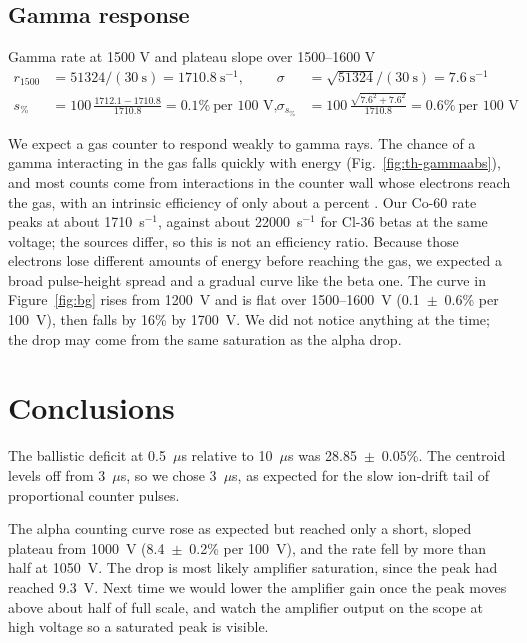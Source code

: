 \documentclass[12pt]{article}
\begin{document}
\subsection{Gamma response}

\begin{samplecalc}{Gamma rate at 1500 V and plateau slope over 1500--1600 V}
\begin{align*}
r_{1500} &= 51324/(30\ \text{s}) = 1710.8\ \text{s}^{-1}, & \sigma &= \sqrt{51324}/(30\ \text{s}) = 7.6\ \text{s}^{-1}\\
s_{\%} &= 100\,\frac{1712.1 - 1710.8}{1710.8} = 0.1\%\ \text{per 100 V}, & \sigma_{s_\%} &= 100\,\frac{\sqrt{7.6^2 + 7.6^2}}{1710.8} = 0.6\%\ \text{per 100 V}
\end{align*}
\end{samplecalc}

We expect a gas counter to respond weakly to gamma rays. The chance of a gamma interacting in the gas falls quickly with energy (Fig.~\ref{fig:th-gammaabs}), and most counts come from interactions in the counter wall whose electrons reach the gas, with an intrinsic efficiency of only about a percent \cite{knoll}. Our Co-60 rate peaks at about 1710~s$^{-1}$, against about 22000~s$^{-1}$ for Cl-36 betas at the same voltage; the sources differ, so this is not an efficiency ratio. Because those electrons lose different amounts of energy before reaching the gas, we expected a broad pulse-height spread and a gradual curve like the beta one. The curve in Figure~\ref{fig:bg} rises from 1200~V and is flat over 1500--1600~V (0.1~$\pm$~0.6\% per 100~V), then falls by 16\% by 1700~V. We did not notice anything at the time; the drop may come from the same saturation as the alpha drop.


\section{Conclusions}
\label{sec:conclusions}

The ballistic deficit at 0.5~$\mu$s relative to 10~$\mu$s was 28.85~$\pm$~0.05\%. The centroid levels off from 3~$\mu$s, so we chose 3~$\mu$s, as expected for the slow ion-drift tail of proportional counter pulses.

The alpha counting curve rose as expected but reached only a short, sloped plateau from 1000~V (8.4~$\pm$~0.2\% per 100~V), and the rate fell by more than half at 1050~V. The drop is most likely amplifier saturation, since the peak had reached 9.3~V. Next time we would lower the amplifier gain once the peak moves above about half of full scale, and watch the amplifier output on the scope at high voltage so a saturated peak is visible.
\end{document}
